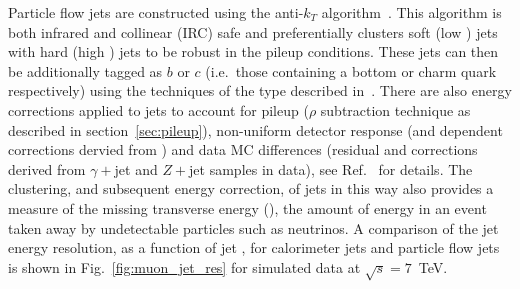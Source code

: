 Particle flow jets are constructed using the anti-$k_{T}$ algorithm~\cite{anti_kt_algo}. This algorithm is both infrared and collinear (IRC) safe and preferentially clusters soft (low \pT) jets with hard (high \pT) jets to be robust in the \LHC pileup conditions. These jets can then be additionally tagged as $b$ or $c$ (i.e.~those containing a bottom or charm quark respectively) using the techniques of the type described in~\cite{b_tag}. There are also energy corrections applied to jets to account for pileup ($\rho$ subtraction technique as described in section~\ref{sec:pileup}), non-uniform detector response (\pT and \eta dependent corrections dervied from \MC) and data MC differences (residual \pT and \eta corrections derived from $\gamma+$jet and $Z+$jet samples in data), see Ref.~\cite{jet_e_corrs} for details. The clustering, and subsequent energy correction, of jets in this way also provides a measure of the missing transverse energy (\MET), the amount of energy in an event taken away by undetectable particles such as neutrinos. A comparison of the jet energy resolution, as a function of jet \pT, for calorimeter jets and particle flow jets is shown in Fig.~\ref{fig:muon_jet_res} for simulated data at $\sqrt{s}=7$~TeV.


